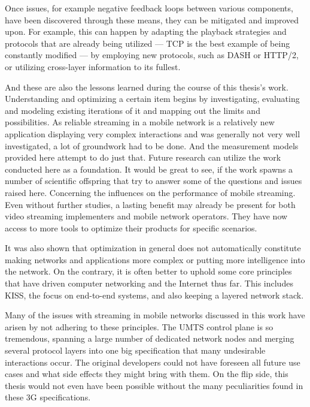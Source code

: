 Once issues, for example negative feedback loops between various components, have been discovered through these means, they can be mitigated and improved upon. For example, this can happen by adapting the playback strategies and protocols that are already being utilized --- \gls{TCP} is the best example of being constantly modified --- by employing new protocols, such as \gls{DASH} or \gls{HTTP}/2, or utilizing cross-layer information to its fullest.

And these are also the lessons learned during the course of this thesis's work. Understanding and optimizing a certain item begins by investigating, evaluating and modeling existing iterations of it and mapping out the limits and possibilities. As reliable streaming in a mobile network is a relatively new application displaying very complex interactions and was generally not very well investigated, a lot of groundwork had to be done. And the measurement models provided here attempt to do just that. Future research can utilize the work conducted here as a foundation. It would be great to see, if the work spawns a number of scientific offspring that try to answer some of the questions and issues raised here. Concerning the influences on the performance of mobile streaming. Even without further studies, a lasting benefit may already be present for both video streaming implementers and mobile network operators. They have now access to more tools to optimize their products for specific scenarios.

It was also shown that optimization in general does not automatically constitute making networks and applications more complex or putting more intelligence into the network. On the contrary, it is often better to uphold some core principles that have driven computer networking and the Internet thus far. This includes \gls{KISS}, the focus on end-to-end systems, and also keeping a layered network stack. 

Many of the issues with streaming in mobile networks discussed in this work have arisen by not adhering to these principles. The \gls{UMTS} control plane is so tremendous, spanning a large number of dedicated network nodes and merging several protocol layers into one big specification that many undesirable interactions occur. The original developers could not have foreseen all future use cases and what side effects they might bring with them. On the flip side, this thesis would not even have been possible without the many peculiarities found in these \gls{3G} specifications.


